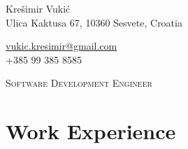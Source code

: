 \documentclass[a4paper,10pt]{article} %
\begin{document}
\pagestyle{empty} %

\begin{minipage}{.5\textwidth}
\LARGE{Krešimir Vukić}\\
\normalsize{Ulica Kaktusa 67, 10360 Sesvete, Croatia}
\end{minipage}%
\begin{minipage}{.5\textwidth}
\raggedleft
\href{mailto:vukic.kresimir@gmail.com}{vukic.kresimir@gmail.com} \\
+385 99 385 8585 \\
\end{minipage}
\vspace{3mm}

\begin{center}
\textsc{\large{Software Development Engineer}}
\end{center}
\vspace{2mm}

\section{Work Experience}
\end{document}
